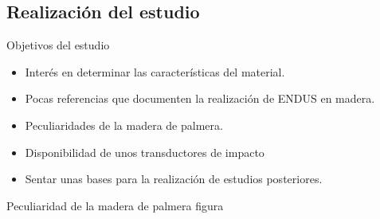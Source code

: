\documentclass[utf8, compress]			{beamer}
\begin{document}
\subsection{Realización del estudio}

\begin{frame}{Objetivos del estudio}
    \begin{itemize}
	\item Interés en determinar las características del material.
	\item Pocas referencias que documenten la realización de ENDUS en
	    madera.
	\item Peculiaridades de la madera de palmera.
	\item Disponibilidad de unos transductores de impacto
	\item \alert{Sentar unas bases para la realización de estudios
	    posteriores.}
    \end{itemize}
\end{frame}

\begin{frame}{Peculiaridad de la madera de palmera}
    \alert{figura}
\end{frame}
\end{document}
